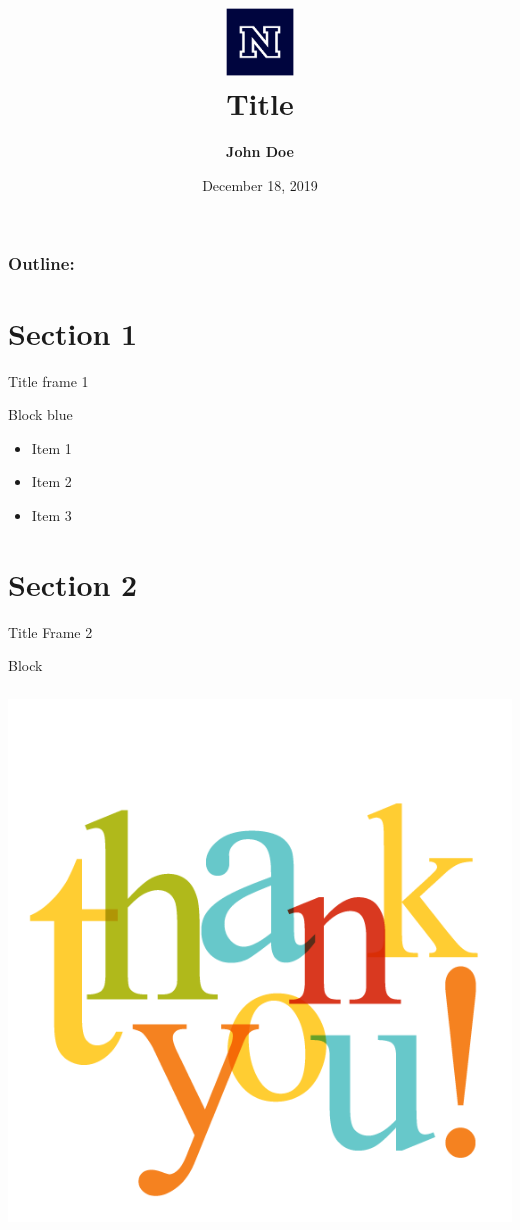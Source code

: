 \documentclass[xcolor=dvipsnames]{beamer}
\title[Title]{\includegraphics[height=1.8cm]{images/nevada-blockn-blue.eps}\\Title}
\author[John Doe]{ \textbf{John Doe}}
\institute[UNR]{University of Nevada, Reno}
\date{December 18, 2019}
\begin{document}
{
\begin{frame}
\vspace{6em}
  \titlepage
\end{frame}
}
\begin{frame}
\frametitle{\textbf{Outline:}}
\tableofcontents
\end{frame}

		
  
    \section{Section 1}  
     \begin{frame}{Title frame 1}
            \begin{block}{Block blue}
    		\begin{itemize}
    		\item Item 1
    		\item Item 2
    		\item Item 3
  			\end{itemize}
        \end{block}  
     \end{frame}
          
   \section{Section 2}  
     \begin{frame}{Title Frame 2}
        \begin{block}{Block}
            \lipsum[2]
        \end{block}
     \end{frame}
     
\begin{frame}\frametitle{}
  \centering
    \includegraphics[scale=0.3]{images/thankyou}
    
\end{frame}

\end{document}

